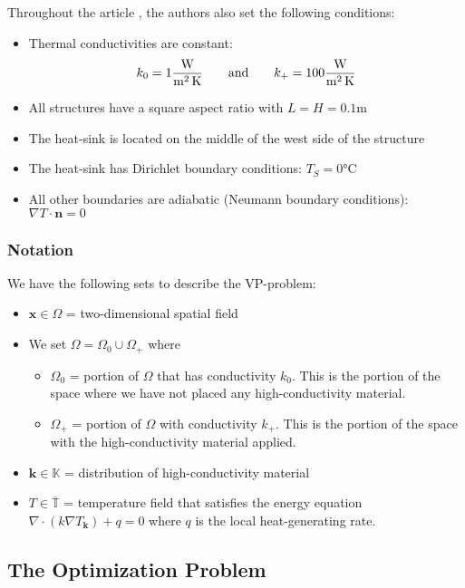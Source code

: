 Throughout the article \cite{Marck2012}, the authors also set the following conditions:
\begin{itemize}
	\item Thermal conductivities are constant:
	$$k_0=1 \si[per-mode=fraction]{\watt\per\square\meter\per\kelvin}\qquad\text{and}\qquad k_+=100 \si[per-mode=fraction]{\watt\per\square\meter\per\kelvin}$$
	\item All structures have a square aspect ratio with $L=H=0.1\si{\meter}$
	\item The heat-sink is located on the middle of the west side of the structure
	\item The heat-sink has Dirichlet boundary conditions: $T_S=0\si{\celsius}$
	\item All other boundaries are adiabatic (Neumann boundary conditions): $\nabla T\cdot\mathbf{n}=0$
\end{itemize}

\subsubsection*{Notation}

We have the following sets to describe the VP-problem:
\begin{itemize}
	\item $\mathbf{x}\in\Omega$ = two-dimensional spatial field
	\item[] We set $\Omega = \Omega_0\cup\Omega_+$ where
	\begin{itemize}
		\item $\Omega_0$ = portion of $\Omega$ that has conductivity $k_0$. This is the portion of the space where we have not placed any high-conductivity material.
		\item $\Omega_+$ = portion of $\Omega$ with conductivity $k_+$. This is the portion of the space with the high-conductivity material applied.
	\end{itemize}
	\item $\mathbf{k}\in\mathbb{K}$ = distribution of high-conductivity material
	\item $T\in\overline{\mathbb{T}}$ = temperature field that satisfies the energy equation $\nabla\cdot\left(k\nabla T_{\mathbf{k}}\right)+q=0$ where $q$ is the local heat-generating rate.
\end{itemize}

\subsection{The Optimization Problem}

